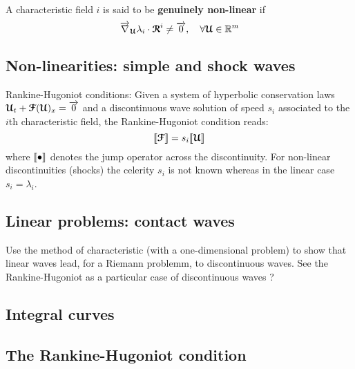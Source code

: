 \begin{definition} A characteristic field $i$ is said to be \textbf{genuinely non-linear} if
  \begin{equation}
    \label{eq:linearly-degenerate}
    {\overrightarrow{\nabla}}_{\boldsymbol{\mathcal{U}}} \lambda_i \cdot {\boldsymbol{\mathcal{R}}}^i \neq {\overrightarrow{0}},\quad \forall {\boldsymbol{\mathcal{U}}} \in \mathbb{R}^m
  \end{equation}
\end{definition}

\subsection{Non-linearities: simple and shock waves}
Rankine-Hugoniot conditions: Given a system of hyperbolic conservation laws ${\boldsymbol{\mathcal{U}}}_t + {\boldsymbol{\mathcal{F}}}({\boldsymbol{\mathcal{U}}})_x={\overrightarrow{0}}$ and a discontinuous wave solution of speed $s_i$ associated to the $i$th characteristic field, the Rankine-Hugoniot condition reads:
\begin{equation}
  \label{eq:rankine-hugoniot}
  \llbracket  {\boldsymbol{\mathcal{F}}} \rrbracket = s_i \llbracket  {\boldsymbol{\mathcal{U}}} \rrbracket
\end{equation}
where $\llbracket \bullet \rrbracket$ denotes the jump operator across the discontinuity. For non-linear discontinuities (shocks) the celerity $s_i$ is not known whereas in the linear case $s_i=\lambda_i$.
\subsection{Linear problems: contact waves}
Use the method of characteristic (with a one-dimensional problem) to show that linear waves lead, for a Riemann problemm, to discontinuous waves. See the Rankine-Hugoniot as a particular case of discontinuous waves ?

\subsection{Integral curves}
\subsection{The Rankine-Hugoniot condition}


